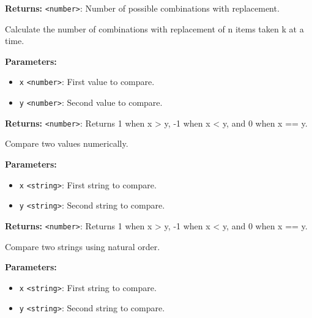 \documentclass[12pt,a4paper]{article}
\begin{document}
\noindent \textbf{Returns:} \texttt{<number>}: Number of possible combinations with replacement.

\noindent Calculate the number of combinations with replacement of n items taken k at a time.

\vspace{5mm}
\noindent {}


\noindent \textbf{Parameters:}
\begin{itemize}
  \item \texttt{x} \texttt{<number>}: First value to compare.
  \item \texttt{y} \texttt{<number>}: Second value to compare.
\end{itemize}

\noindent \textbf{Returns:} \texttt{<number>}: Returns 1 when x > y, -1 when x < y, and 0 when x == y.

\noindent Compare two values numerically.

\vspace{5mm}
\noindent {}


\noindent \textbf{Parameters:}
\begin{itemize}
  \item \texttt{x} \texttt{<string>}: First string to compare.
  \item \texttt{y} \texttt{<string>}: Second string to compare.
\end{itemize}

\noindent \textbf{Returns:} \texttt{<number>}: Returns 1 when x > y, -1 when x < y, and 0 when x == y.

\noindent Compare two strings using natural order.

\vspace{5mm}
\noindent {}


\noindent \textbf{Parameters:}
\begin{itemize}
  \item \texttt{x} \texttt{<string>}: First string to compare.
  \item \texttt{y} \texttt{<string>}: Second string to compare.
\end{itemize}
\end{document}
